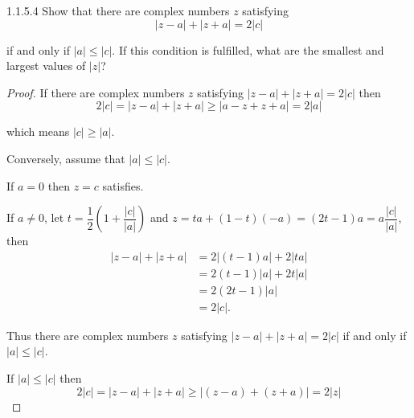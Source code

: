 \begin{problem}{1.1.5.4}
Show that there are complex numbers \( z \) satisfying
\[
	\left\vert z - a \right\vert + \left\vert z + a \right\vert = 2\left\vert c \right\vert
\]

if and only if \( \left\vert a \right\vert \le \left\vert c \right\vert \). If this condition is fulfilled, what are the smallest and largest values of \( \left\vert z \right\vert \)?
\end{problem}

\begin{proof}
	If there are complex numbers \( z \) satisfying \( \left\vert z - a \right\vert + \left\vert z + a \right\vert = 2\left\vert c \right\vert \) then
	\[
		2\left\vert c \right\vert = \left\vert z - a \right\vert + \left\vert z + a \right\vert \ge \left\vert a - z + z + a \right\vert = 2 \left\vert a \right\vert
	\]

	which means \( \left\vert c \right\vert \ge \left\vert a \right\vert \).

	Conversely, assume that \( \left\vert a \right\vert \le \left\vert c \right\vert \).

	If \( a = 0 \) then \( z = c \) satisfies.

	If \( a \ne 0 \), let \( t = \dfrac{1}{2}\left( 1 + \dfrac{\left\vert c \right\vert}{\left\vert a \right\vert} \right) \) and \( z = ta + (1 - t)(-a) = (2t - 1)a = a\dfrac{\left\vert c\right\vert}{\left\vert a\right\vert} \), then
	\begingroup
	\allowdisplaybreaks%
	\begin{align*}
		\left\vert z - a \right\vert + \left\vert z + a \right\vert & = 2 \left\vert (t - 1)a \right\vert + 2 \left\vert ta \right\vert \\
		                                                            & = 2(t - 1) \left\vert a \right\vert + 2t \left\vert a \right\vert \\
		                                                            & = 2(2t - 1) \left\vert a \right\vert                              \\
		                                                            & = 2\left\vert c \right\vert.
	\end{align*}
	\endgroup

	Thus there are complex numbers \( z \) satisfying \( \left\vert z - a \right\vert + \left\vert z + a \right\vert = 2\left\vert c \right\vert \) if and only if \( \left\vert a \right\vert \le \left\vert c \right\vert \).

	\bigskip
	If \( \left\vert a \right\vert \le \left\vert c \right\vert \) then
	\[
		2\left\vert c \right\vert = \left\vert z - a \right\vert + \left\vert z + a \right\vert \ge \left\vert (z - a) + (z + a) \right\vert = 2 \left\vert z \right\vert
	\]


\end{proof}
